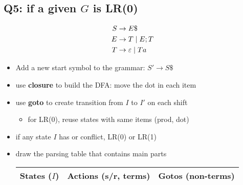 \documentclass[10pt,a4paper,landscape]{article}
\begin{document}
\begin{multicols*}{3}
\section*{Q5: if a given $G$ is LR(0)}
\begin{minipage}{.5\linewidth}
\begin{align*}
  S&\to E\$ \\
  E&\to T \;|\; E;T \\
  T&\to \varepsilon \;|\; Ta
\end{align*}
\end{minipage}
\begin{minipage}{.5\linewidth}
  \centering
\end{minipage}
\begin{itemize}
\item Add a new start symbol to the grammar: $S'\to S\$$
\item use \textbf{closure} to build the DFA: move the dot in each item
\end{itemize}
\begin{itemize}
\item use \textbf{goto} to create transition from $I$ to $I'$ on each shift
  \begin{itemize}[leftmargin=1em]
  \item for LR(0), reuse states with same items (prod, dot)
  \end{itemize}
\item if any state $I$ has  or  conflict,  LR(0) or LR(1)
\item draw the parsing table that contains  main parts
  \begin{minipage}{\linewidth}
    \centering
    \begin{tabular}{l|l|l}
      \hline
      States ($I$) & Actions (s/r, terms) & Gotos (non-terms)\\
      \hline
    \end{tabular}
  \end{minipage}
\end{itemize}

\end{multicols*}
\end{document}
